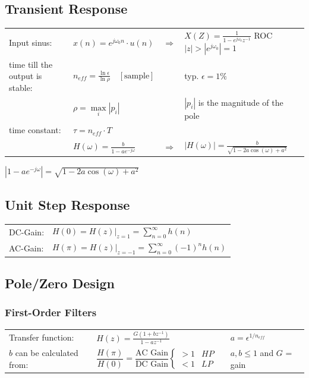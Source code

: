 \subsection{Transient Response}
\begin{tabular}{llll}
  Input sinus: &
  $x(n) = e^{j \omega_0 n} \cdot u(n)$ &
  $\Rightarrow$ &
  $X(Z) = \frac{1}{1-e^{j \omega_0} z^{-1}}$ \qquad
  ROC $|z| > |e^{j\omega_0}|=1$ \\
  
  time till the output is stable: &
  $n_{eff} = \frac{\ln \epsilon}{\ln \rho} \quad [\text{sample}]$ &
  &
  typ. $\epsilon = 1\%$ \\
 
  &
  $\rho = \max\limits_{i}\left|p_i \right| $ &
  &
  $|p_i|$ is the magnitude of the pole\\
  
  time constant: &
  $\tau = n_{eff}\cdot T$ \\
  
  &
  $H(\omega)=\frac{b}{1-ae^{-j\omega}}$ &
  $\Rightarrow$ &
  $\left| H(\omega)\right| = \frac{b}{\sqrt{1-2a\cos(\omega) + a^2}}$ \\
\end{tabular}

$\left| 1-a e^{-j\omega}\right| = \sqrt{1-2a\cos(\omega) + a^2}$\\

\subsection{Unit Step Response}
\begin{tabularx}{1\textwidth}{l X}
	DC-Gain: & $H(0) = H(z)|_{z=1}= \sum\limits_{n=0}^{\infty}h(n) $
	\\
	AC-Gain: & $H(\pi) = H(z)|_{z=-1}= \sum\limits_{n=0}^{\infty}(-1)^n h(n) $
\end{tabularx}


\subsection{Pole/Zero Design}
\subsubsection{First-Order Filters }
  \begin{tabular}{llp{2cm}l}
    Transfer function: &
    $H(z) = \frac{G(1+bz^{-1})}{1-az^{-1}}$ & &
    $a = \epsilon^{1/n_{eff}}$ \\
    $b$ can be calculated from: &
    $\dfrac{H(\pi)}{H(0)} = \dfrac{\text{AC Gain}}{\text{DC Gain}} \left\lbrace \begin{matrix}
      >1 & HP \\
      <1 & LP
    \end{matrix}\right.$ & &
    $a,b \leq 1$ and $G$ = gain
  \end{tabular}

